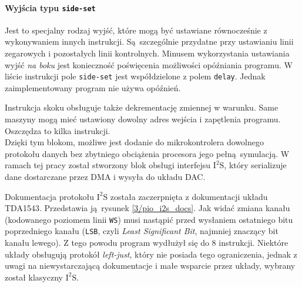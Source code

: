 \documentclass[12pt]{report}
\newcommand{\isqs}{$\text{I}^{2}\text{S}$}
\newcommand{\sset}{\lstinline|side-set|}
\begin{document}
		\paragraph{Wyjścia typu \sset{}}
			Jest to specjalny rodzaj wyjść, które mogą być ustawiane równocześnie z wykonywaniem innych instrukcji. Są szczególnie przydatne przy ustawianiu linii zegarowych i pozostałych linii kontrolnych. Minusem wykorzystania ustawiania wyjść \textit{na boku} jest konieczność poświęcenia możliwości opóźniania programu. W liście instrukcji pole \sset{} jest współdzielone z polem \lstinline|delay|. Jednak zaimplementowany program nie używa opóźnień.
		
		Instrukcja skoku obsługuje także dekrementację zmiennej w warunku. Same maszyny mogą mieć ustawiony dowolny adres wejścia i zapętlenia programu. Oszczędza to kilka instrukcji.
		$ $\\
		
		Dzięki tym blokom, możliwe jest dodanie do mikrokontrolera dowolnego protokołu danych bez zbytniego obciążenia procesora jego pełną symulacją. W ramach tej pracy został stworzony blok obsługi interfejsu \isqs{}, który serializuje dane dostarczane przez DMA i wysyła do układu DAC.
		
		Dokumentacja protokołu \isqs{} została zaczerpnięta z dokumentacji układu TDA1543. Przedstawia ją rysunek \ref{3/pio_i2s_docs}. Jak widać zmiana kanału (kodowanego poziomem linii \lstinline|WS|)  musi nastąpić przed wysłaniem ostatniego bitu poprzedniego kanału (\lstinline|LSB|, czyli \textit{Least Significant Bit}, najmniej znaczący bit kanału lewego). Z tego powodu program wydłużył się do 8 instrukcji. Niektóre układy obsługują protokół \textit{left-just}, który nie posiada tego ograniczenia, jednak z uwagi na niewystarczającą dokumentacje i małe wsparcie przez układy, wybrany został klasyczny \isqs{}.
		
		\begin{minipage}{\linewidth}
			
		\end{minipage}
		
\end{document}
